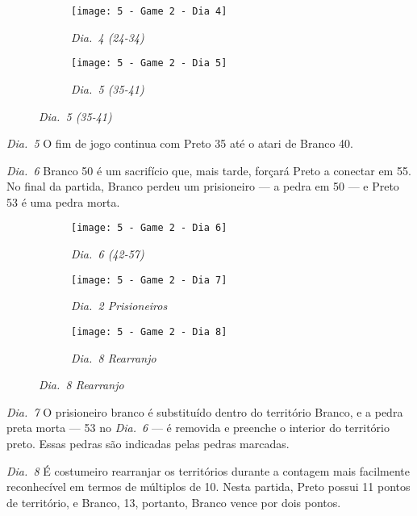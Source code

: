 \begin{figure}[h!]
  \centering
  \begin{subfigure}[t]{.3\textwidth}
      \centering
      \texttt{[image: 5 - Game 2 - Dia 4]}
      \caption*{\emph{Dia.\@~4 (24-34)}}
  \end{subfigure}
  \hspace{1cm}
  \begin{subfigure}[t]{.3\textwidth}
      \centering
      \texttt{[image: 5 - Game 2 - Dia 5]}
      \caption*{\emph{Dia.\@~5 (35-41)}}
  \end{subfigure}
\end{figure}

\emph{Dia.\@~5} O fim de jogo continua com Preto 35 até o atari de Branco 40.

\pagebreak

\emph{Dia.\@~6} Branco 50 é um sacrifício que, mais tarde, forçará Preto a conectar em 55. No final da partida, Branco perdeu um prisioneiro --- a pedra em 50 --- e Preto 53 é uma pedra morta.

\begin{figure}[h!]
  \centering
  \begin{subfigure}[t]{.3\textwidth}
      \centering
      \texttt{[image: 5 - Game 2 - Dia 6]}
      \caption*{\emph{Dia.\@~6 (42-57)}}
  \end{subfigure}
  \hfill
  \begin{subfigure}[t]{.3\textwidth}
      \centering
      \texttt{[image: 5 - Game 2 - Dia 7]}
      \caption*{\emph{Dia.\@~2 Prisioneiros}}
  \end{subfigure}
  \hfill
  \begin{subfigure}[t]{.3\textwidth}
    \centering
    \texttt{[image: 5 - Game 2 - Dia 8]}
    \caption*{\emph{Dia.\@~8 Rearranjo}}
  \end{subfigure}
\end{figure}

\emph{Dia.\@~7} O prisioneiro branco é substituído dentro do território Branco, e a pedra preta morta --- 53 no \emph{Dia.\@~6} --- é removida e preenche o interior do território preto. Essas pedras são indicadas pelas pedras marcadas.

\emph{Dia.\@~8} É costumeiro rearranjar os territórios durante a contagem mais facilmente reconhecível em termos de múltiplos de 10. Nesta partida, Preto possui 11 pontos de território, e Branco, 13, portanto, Branco vence por dois pontos.